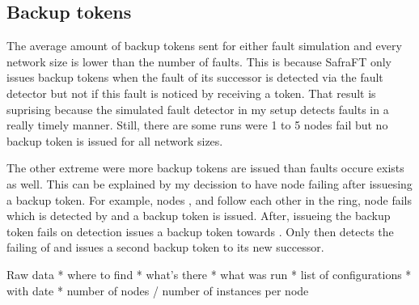 \subsection{Backup tokens}
The average amount of backup tokens sent for either fault simulation and every network size is lower than the number of faults.
This is because SafraFT only issues backup tokens when the fault of its successor is detected via the fault detector but not if this fault is noticed by receiving a token.
That result is suprising because the simulated fault detector in my setup detects faults in a really timely manner.
Still, there are some runs were 1 to 5 nodes fail but no backup token is issued for all network sizes. 

The other extreme were more backup tokens are issued than faults occure exists as well.
This can be explained by my decission to have node failing after issuesing a backup token.
For example, nodes ,  and  follow each other in the ring, node  fails which is detected by  and a backup token is issued.
After, issueing the backup token  fails on detection  issues a backup token towards .
Only then  detects the failing of  and issues a second backup token to its new successor.  



Raw data 
* where to find
* what's there
* what was run
* list of configurations
* with date
* number of nodes / number of instances per node


